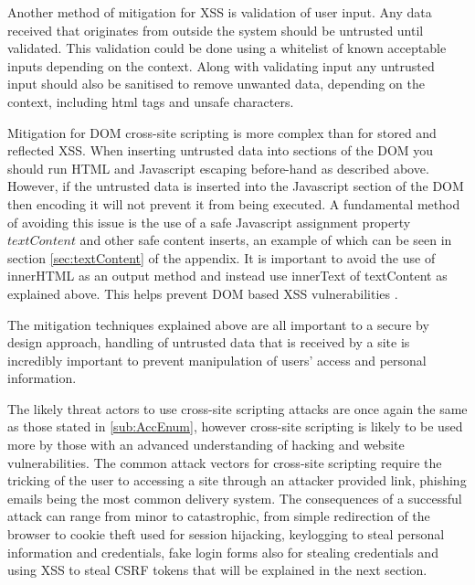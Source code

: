 \documentclass{ueacmpstyle}
\begin{document}
      Another method of mitigation for XSS is validation of user input. Any data received 
      that originates from outside the system should be untrusted until validated. This 
      validation could be done using a whitelist of known acceptable inputs depending on 
      the context.
      Along with validating input any untrusted input should also be sanitised to remove 
      unwanted data, depending on the context, including html tags and unsafe characters. 

      Mitigation for DOM cross-site scripting is more complex than for stored and reflected 
      XSS. When inserting untrusted data into sections of the DOM you should run HTML and 
      Javascript escaping before-hand as described above. However, if the untrusted data is 
      inserted into the Javascript section of the DOM then encoding it will not prevent it 
      from being executed. A fundamental method of avoiding this issue is the use of a safe 
      Javascript assignment property $textContent$ and other safe content inserts, an example 
      of which can be seen in section \ref{sec:textContent} of the appendix. It is important 
      to avoid the use of innerHTML as an output method and instead use innerText of 
      textContent as explained above. This helps prevent DOM based XSS vulnerabilities 
      \citep{OWASPDOMXSSPrevention}. 

      The mitigation techniques explained above are all important to a secure by design 
      approach, handling of untrusted data that is received by a site is incredibly important 
      to prevent manipulation of users' access and personal information.

      The likely threat actors to use cross-site scripting attacks are once again the 
      same as those stated in \ref{sub:AccEnum}, however cross-site scripting is likely to be 
      used more by those with an advanced understanding of hacking and website vulnerabilities. 
      The common attack vectors for cross-site scripting require the tricking of the user to 
      accessing a site through an attacker provided link, phishing emails being the most common 
      delivery system. The consequences of a successful attack can range from minor to 
      catastrophic, from simple redirection of the browser to cookie theft used for session 
      hijacking, keylogging to steal personal information and credentials, fake login forms also 
      for stealing credentials and using XSS to steal CSRF tokens that will be explained in 
      the next section.
\end{document}
